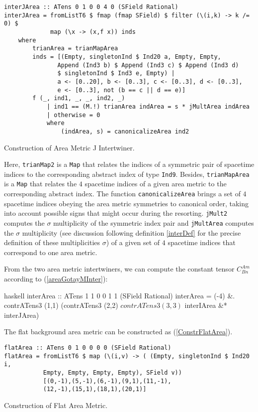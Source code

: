 \begin{listing}[hbt!]
\begin{verbatim}
interJArea :: ATens 0 1 0 0 4 0 (SField Rational)
interJArea = fromListT6 $ fmap (fmap SField) $ filter (\(i,k) -> k /= 0) $
             map (\x -> (x,f x)) inds
    where
        trianArea = trianMapArea
        inds = [(Empty, singletonInd $ Ind20 a, Empty, Empty,
               Append (Ind3 b) $ Append (Ind3 c) $ Append (Ind3 d)
               $ singletonInd $ Ind3 e, Empty) |
               a <- [0..20], b <- [0..3], c <- [0..3], d <- [0..3],
               e <- [0..3], not (b == c || d == e)]
        f (_, ind1, _, _, ind2, _)
            | ind1 == (M.!) trianArea indArea = s * jMultArea indArea
            | otherwise = 0
            where
                (indArea, s) = canonicalizeArea ind2
\end{verbatim} 
\caption{Construction of Area Metric J Intertwiner.}\label{ConstrInterJArea}
\end{listing}
Here, \texttt{trianMap2} is a \texttt{Map} that relates the indices of a symmetric pair of spacetime indices to the corresponding abstract index of type \texttt{Ind9}. Besides, \texttt{trianMapArea} is a \texttt{Map} that relates the $4$ spacetime indices of a given area metric to the corresponding abstract index. The function \texttt{canonicalizeArea} brings a set of $4$ spacetime indices obeying the area metric symmetries to canonical order, taking into account possible signs that might occur during the resorting. \texttt{jMult2} computes the $\sigma$ multiplicity of the symmetric index pair and \texttt{jMultArea} computes the $\sigma$ multiplicity (see discussion following definition \ref{interDef} for the precise definition of these multiplicities $\sigma$) of a given set of $4$ spacetime indices that correspond to one area metric.

From the two area metric intertwiners, we can compute the constant tensor $C^{Am}_{Bn}$ according to (\ref{areaGotayMInter}):

\begin{center}
\begin{cminted}{haskell}
interArea :: ATens 1 1 0 0 1 1 (SField Rational)
interArea = (-4) &. contrATens3 (1,1) (contrATens3 (2,2) $
            contrATens3 (3,3) $ interIArea &* interJArea)
\end{cminted}
\end{center}
The flat background area metric can be constructed as (\ref{ConstrFlatArea}).
\begin{listing}[hbt!]
\begin{verbatim}
flatArea :: ATens 0 1 0 0 0 0 (SField Rational)
flatArea = fromListT6 $ map (\(i,v) -> ( (Empty, singletonInd $ Ind20 i,
           Empty, Empty, Empty, Empty), SField v))
           [(0,-1),(5,-1),(6,-1),(9,1),(11,-1),
           (12,-1),(15,1),(18,1),(20,1)]
\end{verbatim} 
\caption{Construction of Flat Area Metric.}\label{ConstrFlatArea}
\end{listing}

